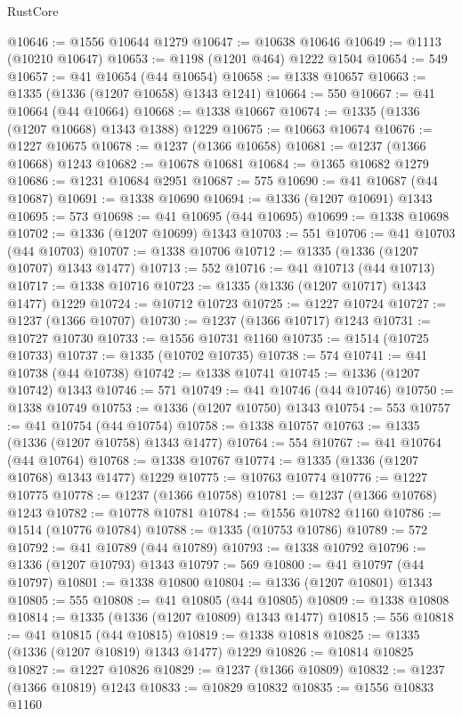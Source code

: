 \begin{lexlean}{RustCore}
\begin{coremodule}
@10646 := @1556 @10644 @1279
@10647 := @10638 @10646
@10649 := @1113 (@10210 @10647)
@10653 := @1198 (@1201 @464) @1222 @1504
@10654 := 549
@10657 := @41 @10654 (@44 @10654)
@10658 := @1338 @10657
@10663 := @1335 (@1336 (@1207 @10658) @1343 @1241)
@10664 := 550
@10667 := @41 @10664 (@44 @10664)
@10668 := @1338 @10667
@10674 := @1335 (@1336 (@1207 @10668) @1343 @1388) @1229
@10675 := @10663 @10674
@10676 := @1227 @10675
@10678 := @1237 (@1366 @10658)
@10681 := @1237 (@1366 @10668) @1243
@10682 := @10678 @10681
@10684 := @1365 @10682 @1279
@10686 := @1231 @10684 @2951
@10687 := 575
@10690 := @41 @10687 (@44 @10687)
@10691 := @1338 @10690
@10694 := @1336 (@1207 @10691) @1343
@10695 := 573
@10698 := @41 @10695 (@44 @10695)
@10699 := @1338 @10698
@10702 := @1336 (@1207 @10699) @1343
@10703 := 551
@10706 := @41 @10703 (@44 @10703)
@10707 := @1338 @10706
@10712 := @1335 (@1336 (@1207 @10707) @1343 @1477)
@10713 := 552
@10716 := @41 @10713 (@44 @10713)
@10717 := @1338 @10716
@10723 := @1335 (@1336 (@1207 @10717) @1343 @1477) @1229
@10724 := @10712 @10723
@10725 := @1227 @10724
@10727 := @1237 (@1366 @10707)
@10730 := @1237 (@1366 @10717) @1243
@10731 := @10727 @10730
@10733 := @1556 @10731 @1160
@10735 := @1514 (@10725 @10733)
@10737 := @1335 (@10702 @10735)
@10738 := 574
@10741 := @41 @10738 (@44 @10738)
@10742 := @1338 @10741
@10745 := @1336 (@1207 @10742) @1343
@10746 := 571
@10749 := @41 @10746 (@44 @10746)
@10750 := @1338 @10749
@10753 := @1336 (@1207 @10750) @1343
@10754 := 553
@10757 := @41 @10754 (@44 @10754)
@10758 := @1338 @10757
@10763 := @1335 (@1336 (@1207 @10758) @1343 @1477)
@10764 := 554
@10767 := @41 @10764 (@44 @10764)
@10768 := @1338 @10767
@10774 := @1335 (@1336 (@1207 @10768) @1343 @1477) @1229
@10775 := @10763 @10774
@10776 := @1227 @10775
@10778 := @1237 (@1366 @10758)
@10781 := @1237 (@1366 @10768) @1243
@10782 := @10778 @10781
@10784 := @1556 @10782 @1160
@10786 := @1514 (@10776 @10784)
@10788 := @1335 (@10753 @10786)
@10789 := 572
@10792 := @41 @10789 (@44 @10789)
@10793 := @1338 @10792
@10796 := @1336 (@1207 @10793) @1343
@10797 := 569
@10800 := @41 @10797 (@44 @10797)
@10801 := @1338 @10800
@10804 := @1336 (@1207 @10801) @1343
@10805 := 555
@10808 := @41 @10805 (@44 @10805)
@10809 := @1338 @10808
@10814 := @1335 (@1336 (@1207 @10809) @1343 @1477)
@10815 := 556
@10818 := @41 @10815 (@44 @10815)
@10819 := @1338 @10818
@10825 := @1335 (@1336 (@1207 @10819) @1343 @1477) @1229
@10826 := @10814 @10825
@10827 := @1227 @10826
@10829 := @1237 (@1366 @10809)
@10832 := @1237 (@1366 @10819) @1243
@10833 := @10829 @10832
@10835 := @1556 @10833 @1160

\end{coremodule}
\end{lexlean}
